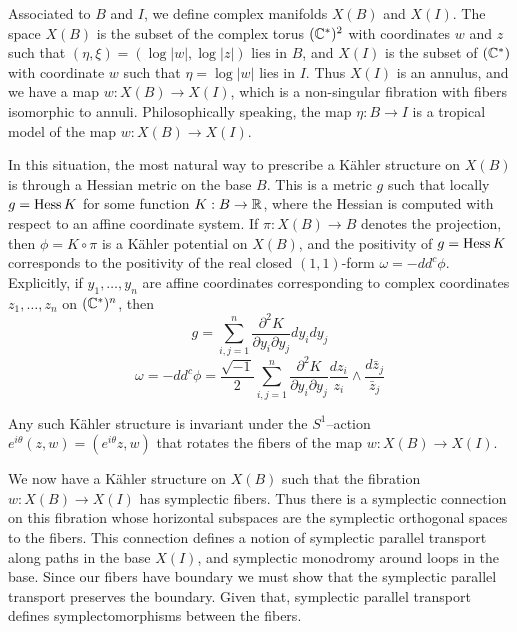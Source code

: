 \documentclass[12pt]{amsart}
\begin{document}

Associated to $B$ and $I$, we define complex manifolds $X(B)$ and
$X(I)$. The space $X(B)$ is the subset of the complex torus $(\mathbb{C}^*)^2$
with coordinates $w$ and $z$ such that $(\eta,\xi) =
(\log|w|,\log|z|)$ lies in $B$, and $X(I)$ is the subset of $(\mathbb{C}^*)$
with coordinate $w$ such that $\eta = \log|w|$ lies in $I$. Thus
$X(I)$ is an annulus, and we have a map $w : X(B) \to X(I)$, which is
a non-singular fibration with fibers isomorphic to annuli. Philosophically speaking, the map
$\eta: B \to I$ is a tropical model of the map $w: X(B)\to X(I)$.

In this situation, the most natural way to prescribe a K\"{a}hler
structure on $X(B)$ is through a Hessian metric on the base $B$. This
is a metric $g$ such that locally $g = \operatorname{Hess} K$ for some function $K:
B\to \mathbb{R}$, where the Hessian is computed with respect to an affine
coordinate system. If $\pi: X(B) \to B$ denotes the projection, then
$\phi = K\circ \pi$ is a K\"{a}hler potential on $X(B)$, and the
positivity of $g = \operatorname{Hess} K$ corresponds to the positivity of the real
closed $(1,1)$-form $\omega = -dd^c \phi$. Explicitly, if $y_1,\dots,
y_n$ are affine coordinates corresponding to complex coordinates
$z_1,\dots,z_n$ on $(\mathbb{C}^*)^n$, then
\begin{equation}
  \label{eq:hessian-metric}
  g = \sum_{i,j=1}^n \frac{\partial^2 K}{\partial y_i\partial y_j}dy_idy_j
\end{equation}
\begin{equation}
  \label{eq:hessian-kahler-form}
  \omega = -dd^c \phi = \frac{\sqrt{-1}}{2}\sum_{i,j=1}^n  \frac{\partial^2 K}{\partial y_i\partial y_j}\frac{dz_i}{z_i} \wedge \frac{d\bar{z}_j}{\bar{z}_j}
\end{equation}

Any such K\"{a}hler structure is invariant under the $S^1$--action
$e^{i\theta}(z,w) = (e^{i\theta}z,w)$ that rotates the fibers of the
map $w: X(B)\to X(I)$.

We now have a K\"{a}hler structure on $X(B)$ such that the fibration
$w: X(B) \to X(I)$ has symplectic fibers. Thus there is a symplectic
connection on this fibration whose horizontal subspaces are the
symplectic orthogonal spaces to the fibers. This connection defines a
notion of symplectic parallel transport along paths in the base
$X(I)$, and symplectic monodromy around loops in the base. Since our
fibers have boundary we must show that the symplectic parallel
transport preserves the boundary. Given that, symplectic parallel
transport defines symplectomorphisms between the fibers.
\end{document}

